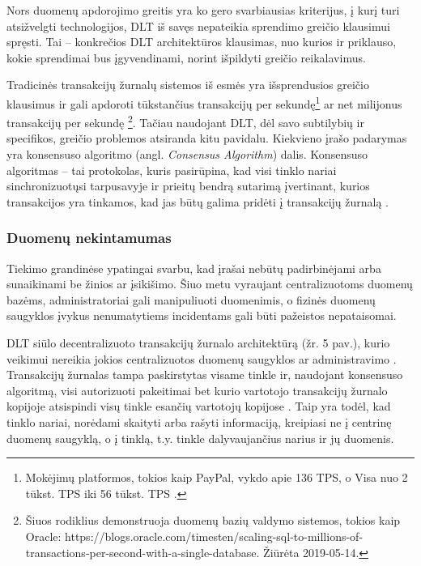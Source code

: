 Nors duomenų apdorojimo greitis yra ko gero svarbiausias kriterijus, į kurį turi atsižvelgti technologijos, DLT iš savęs nepateikia sprendimo greičio klausimui spręsti. Tai – konkrečios DLT architektūros klausimas, nuo kurios ir priklauso, kokie sprendimai bus įgyvendinami, norint išpildyti greičio reikalavimus.

Tradicinės transakcijų žurnalų sistemos iš esmės yra išsprendusios greičio klausimus ir gali apdoroti tūkstančius transakcijų per sekundę\footnote{Mokėjimų platformos, tokios kaip PayPal, vykdo apie 136 TPS, o Visa nuo 2 tūkst. TPS iki 56 tūkst. TPS \cite{herrera2016privacy}.} ar net milijonus transakcijų per sekundę \footnote{Šiuos rodiklius demonstruoja duomenų bazių valdymo sistemos, tokios kaip Oracle: https://blogs.oracle.com/timesten/scaling-sql-to-millions-of-transactions-per-second-with-a-single-database. Žiūrėta 2019-05-14.}. Tačiau naudojant DLT, dėl savo subtilybių ir specifikos, greičio problemos atsiranda kitu pavidalu. Kiekvieno įrašo padarymas yra konsensuso algoritmo (angl. \textit{Consensus Algorithm}) dalis. Konsensuso algoritmas – tai protokolas, kuris pasirūpina, kad visi tinklo nariai sinchronizuotųsi tarpusavyje ir prieitų bendrą sutarimą įvertinant, kurios transakcijos yra tinkamos, kad jas būtų galima pridėti į transakcijų žurnalą \cite{cachin2017blockchain}. 




\subsubsection{Duomenų nekintamumas}

Tiekimo grandinėse ypatingai svarbu, kad įrašai nebūtų padirbinėjami arba sunaikinami be žinios ar įsikišimo. Šiuo metu vyraujant centralizuotoms duomenų bazėms, administratoriai gali manipuliuoti duomenimis, o fizinės duomenų saugyklos įvykus nenumatytiems incidentams gali būti pažeistos nepataisomai.

DLT siūlo decentralizuoto transakcijų žurnalo architektūrą (žr. 5 pav.), kurio veikimui nereikia jokios centralizuotos duomenų saugyklos ar administravimo \cite{yu2018virtualization}. Transakcijų žurnalas tampa paskirstytas visame tinkle ir, naudojant konsensuso algoritmą, visi autorizuoti pakeitimai bet kurio vartotojo transakcijų žurnalo kopijoje atsispindi visų tinkle esančių vartotojų kopijose \cite{puthal2018blockchain}. Taip yra todėl, kad tinklo nariai, norėdami skaityti arba rašyti informaciją, kreipiasi ne į centrinę duomenų saugyklą, o į tinklą, t.y. tinkle dalyvaujančius narius ir jų duomenis.

